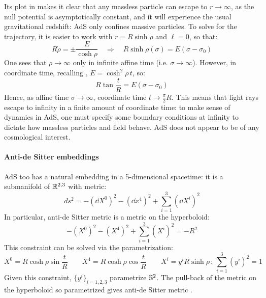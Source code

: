 Its plot in  makes it clear that any massless particle can escape to $ r \rightarrow \infty $, as the null potential is asymptotically constant, and it will experience the usual gravitational redshift: AdS only confines massive particles.
To solve for the trajectory, it is easier to work with $ r = R \sinh \rho $ and $ \ell = 0 $, so that:
\begin{equation*}
  R \dot{\rho} = \pm \frac{E}{\cosh \rho}
  \quad \Rightarrow \quad
  R \sinh \rho(\sigma) = E (\sigma - \sigma_0)
\end{equation*}
One sees that $ \rho \rightarrow \infty $ only in infinite affine time (i.e. $ \sigma \rightarrow \infty $). However, in coordinate time, recalling , $ E = \cosh^2 \rho\, \dot{t} $, so:
\begin{equation*}
  R \tan \frac{t}{R} = E (\sigma - \sigma_0)
\end{equation*}
Hence, as affine time $ \sigma \rightarrow \infty $, coordinate time $ t \rightarrow \frac{\pi}{2} R $. This means that light rays escape to infinity in a finite amount of coordinate time: to make sense of dynamics in AdS, one must specify some boundary conditions at infinity to dictate how massless particles and field behave.
AdS does not appear to be of any cosmological interest.

\paragraph{Anti-de Sitter embeddings}

AdS too has a natural embedding in a 5-dimensional spacetime: it is a submanifold of $ \mathbb{R}^{2,3} $ with metric:
\begin{equation}
  ds^2 = - (\dd X^0)^2 - (\dd x^4)^2 + \sum_{i = 1}^{3} (\dd X^i)^2
  \label{eq:ads-param-metric}
\end{equation}
In particular, anti-de Sitter metric  is a metric on the hyperboloid:
\begin{equation}
  - (X^0)^2 - (X^4)^2 + \sum_{i = 1}^{3} (X^i)^2 = - R^2
  \label{eq:ads-param}
\end{equation}
This constraint can be solved via the parametrization:
\begin{equation*}
  X^0 = R \cosh \rho \sin \frac{t}{R}
  \qquad
  X^4 = R \cosh \rho \cos \frac{t}{R}
  \qquad
  X^i = y^i R \sinh \rho
  \,:\,
  \sum_{i = 1}^{3} (y^i)^2 = 1
\end{equation*}
Given this constraint, $ \{y^i\}_{i = 1,2,3} $ parametrize $ \mathbb{S}^{2} $. The pull-back of the metric  on the hyperboloid so parametrized gives anti-de Sitter metric .

